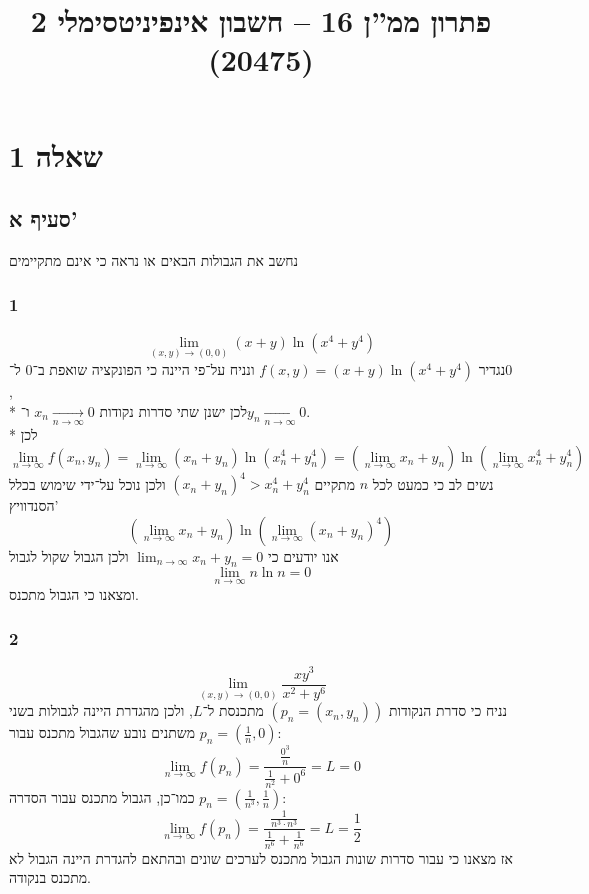 
\title{פתרון ממ''ן 16 – חשבון אינפיניטסימלי 2 (20475)}


\maketitle
\maketitleprint{}

\section{שאלה 1}
\subsection{סעיף א'}
נחשב את הגבולות הבאים או נראה כי אינם מתקיימים

\subsubsection{1}
\[
	\lim_{(x, y) \to (0, 0)} (x + y) \ln(x^4 + y^4)
\]
נגדיר $f(x, y) = (x + y) \ln(x^4 + y^4)$ ונניח על־פי היינה כי הפונקציה שואפת ב־$0$ ל־$0$, \\*
לכן ישנן שתי סדרות נקודות $x_n \underset{n \to \infty}{\to} 0$ ו־$y_n \underset{n \to \infty}{\to} 0$. \\*
לכן
\[
	\lim_{n \to \infty} f(x_n, y_n)
	= \lim_{n \to \infty} (x_n + y_n) \ln(x_n^4 + y_n^4)
	= (\lim_{n \to \infty} x_n + y_n) \ln(\lim_{n \to \infty} x_n^4 + y_n^4)
\]
נשים לב כי כמעט לכל $n$ מתקיים ${(x_n + y_n)}^4 > x_n^4 + y_n^4$ ולכן נוכל על־ידי שימוש בכלל הסנדוויץ'
\[
	(\lim_{n \to \infty} x_n + y_n) \ln(\lim_{n \to \infty} {(x_n + y_n)}^4)
\]
אנו יודעים כי $\lim_{n \to \infty} x_n + y_n = 0$ ולכן הגבול שקול לגבול
\[
	\lim_{n \to \infty} n \ln n = 0
\]
ומצאנו כי הגבול מתכנס.

\subsubsection{2}
\[
	\lim_{(x, y) \to (0, 0)} \frac{xy^3}{x^2 + y^6}
\]
נניח כי סדרת הנקודות $(p_n = (x_n, y_n))$ מתכנסת ל־$L$,
ולכן מהגדרת היינה לגבולות בשני משתנים נובע שהגבול מתכנס עבור $p_n = (\frac{1}{n}, 0)$:
\[
	\lim_{n \to \infty} f(p_n)
	= \frac{\frac{0^3}{n}}{\frac{1}{n^2} + 0^6}
	= L = 0
\]
כמו־כן, הגבול מתכנס עבור הסדרה $p_n = (\frac{1}{n^3}, \frac{1}{n})$:
\[
	\lim_{n \to \infty} f(p_n)
	= \frac{\frac{1}{n^3 \cdot n^3}}{\frac{1}{n^6} + \frac{1}{n^6}}
	= L = \frac{1}{2}
\]
אז מצאנו כי עבור סדרות שונות הגבול מתכנס לערכים שונים ובהתאם להגדרת היינה הגבול לא מתכנס בנקודה.

